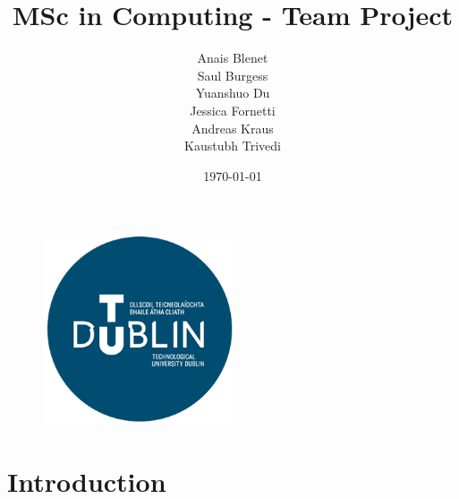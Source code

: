 \documentclass{report}
\begin{document}
\begin{figure}
    \centering
    \includegraphics[width=0.5\textwidth]{Figures/tud_logo.png}
\end{figure}
\title{MSc in Computing - Team Project}
\author{Anais Blenet\\Saul Burgess\\Yuanshuo Du\\Jessica Fornetti\\Andreas Kraus\\Kaustubh Trivedi}
\date{\today}

\renewcommand{\cfttoctitlefont}{\hfill\Huge\bfseries} %
\renewcommand{\cftaftertoctitle}{\hfill}

\maketitle %

\tableofcontents
\newpage

\chapter{Introduction}
\end{document}
